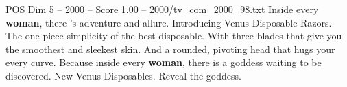 \begin{textsample}{POS Dim 5 – 2000 – Score 1.00 – 2000/tv\_com\_2000\_98.txt}  \label{ex:f5_pos_063}
Inside every \textbf{woman}, there 's adventure and allure.
Introducing Venus Disposable Razors.
The one-piece simplicity of the best disposable.
With three blades that give you the smoothest and sleekest skin.
And a rounded, pivoting head that hugs your every curve.
Because inside every \textbf{woman}, there is a goddess waiting to be discovered.
New Venus Disposables.
Reveal the goddess.

\end{textsample}
